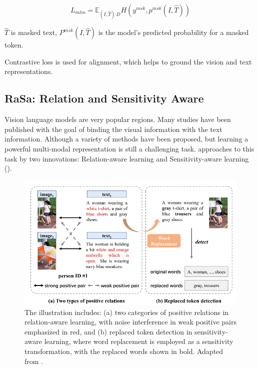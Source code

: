 \begin{displaymath}
    L_{mlm} = \mathbb{E}_{(I,\hat{T})~D}H(y^{msk}, p^{msk}(I,\hat{T}))
\end{displaymath}

$\hat{T}$ is masked text, $P^{msk}(I,\hat{T})$ is the model's predicted probability for a masked token. 

Contrastive loss is used for alignment, which helps to ground the vision and text representations.

\subsection{RaSa: Relation and Sensitivity Aware}

Vision language models are very popular regions. Many studies have been published with the goal of binding the visual information with the text information. Although a variety of methods have been proposed, but learning a powerful multi-modal representation is still a challenging task. \cite{Bai2023RaSaRA} approaches to this task by two innovations: Relation-aware learning and Sensitivity-aware learning (\cite{Bai2023RaSaRA}).

\begin{figure}
    \includegraphics[width=\linewidth]{img/weak_positive_relation.png}
    \caption{The illustration includes: (a) two categories of positive relations in relation-aware learning, with noise interference in weak positive pairs emphasized in red, and (b) replaced token detection in sensitivity-aware learning, where word replacement is employed as a sensitivity transformation, with the replaced words shown in bold. Adapted from \cite{Bai2023RaSaRA}.}
    \label{img:rasa}
\end{figure}

